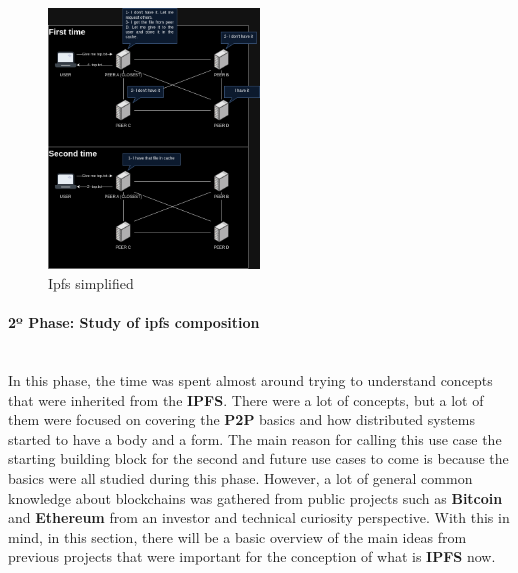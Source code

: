 \begin{figure}[H]
    \centering
    \includegraphics[width=0.5\textwidth]{assets/use-case-1/ipfs-behavior.drawio.png} %
    \caption{Ipfs simplified}
    \label{fig:sample-image} 
\end{figure}

\paragraph{2º Phase: Study of ipfs composition}\mbox{}\\
In this phase, the time was spent almost around trying to understand concepts that were inherited from the \textbf{IPFS}. There were a lot of concepts, but a lot of them were focused on covering the \textbf{P2P} basics and how distributed systems started to have a body and a form. The main reason for calling this use case the starting building block for the second and future use cases to come is because the basics were all studied during this phase. However, a lot of general common knowledge about blockchains was gathered from public projects such as \textbf{Bitcoin} and \textbf{Ethereum} from an investor and technical curiosity perspective. With this in mind, in this section, there will be a basic overview of the main ideas from previous projects that were important for the conception of what is \textbf{IPFS} now.

